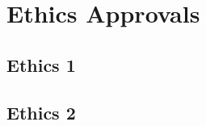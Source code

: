 \chapter{Ethics Approvals}\label{app:ethics}

\newpage
\section{Ethics 1}\label{app:ethics:reb_details}
\begin{figure}[h]
	\centering
\end{figure}

\newpage
\section{Ethics 2}\label{app:ethics2}
\begin{figure}[h]
	\centering
\end{figure}
